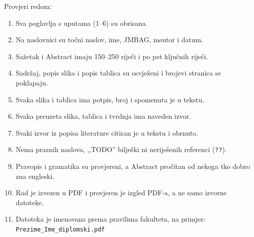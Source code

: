 \documentclass[12pt,a4paper,oneside]{report}
\begin{document}
Provjeri redom:

\begin{enumerate}[leftmargin=*,itemsep=3pt,topsep=4pt]
  \item Sva poglavlja s uputama (1--6) su obrisana.
  \item Na naslovnici su točni naslov, ime, JMBAG, mentor i datum.
  \item Sažetak i Abstract imaju 150--250 riječi i po pet ključnih riječi.
  \item Sadržaj, popis slika i popis tablica su osvježeni i brojevi stranica se poklapaju.
  \item Svaka slika i tablica ima potpis, broj i spomenuta je u tekstu.
  \item Svaka preuzeta slika, tablica i tvrdnja ima naveden izvor.
  \item Svaki izvor iz popisa literature citiran je u tekstu i obrnuto.
  \item Nema praznih naslova, ,,TODO'' bilješki ni neriješenih referenci (\texttt{??}).
  \item Pravopis i gramatika su provjereni, a Abstract pročitan od nekoga tko dobro zna engleski.
  \item Rad je izvezen u PDF i provjeren je izgled PDF-a, a ne samo izvorne datoteke.
  \item Datoteka je imenovana prema pravilima fakulteta, na primjer:\\
        \texttt{\small Prezime\_Ime\_diplomski.pdf}
\end{enumerate}

\cleardoublepage
{}


\end{document}
